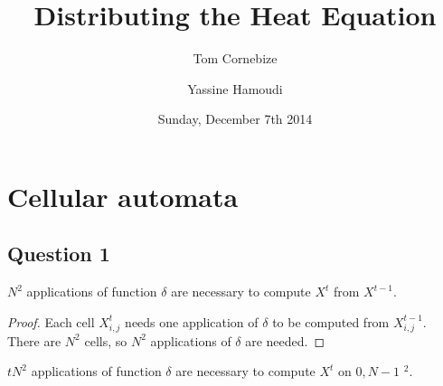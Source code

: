 


\title{Distributing the Heat Equation}
\author{Tom Cornebize \and Yassine Hamoudi}
\date{Sunday, December 7th 2014}



\maketitle


\section{Cellular automata}


\subsection*{Question 1}

\begin{lemma}
  \label{nextStep}
  $N^2$ applications of function $\delta$ are necessary to compute $X^t$ from $X^{t-1}$.
\end{lemma}

\begin{proof}
 Each cell $X^{t}_{i,j}$ needs one application of $\delta$ to be computed from $X^{t-1}_{i,j}$. There are $N^2$ cells, so $N^2$ applications of $\delta$ are needed.
\end{proof}

\begin{prop}
  $tN^2$ applications of function $\delta$ are necessary to compute $X^t$ on \textlbrackdbl $0,N-1$ \textrbrackdbl$^2$.
\end{prop}

